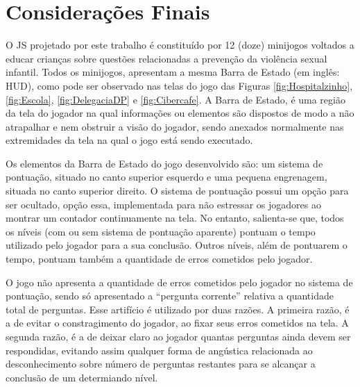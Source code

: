 
\section{Considerações Finais}\label{sec:fim}

O \acf{JS} projetado por este trabalho é constituído por 12 (doze) minijogos voltados a educar crianças sobre questões relacionadas a prevenção da violência sexual infantil. Todos os minijogos, apresentam a mesma Barra de Estado (em inglês: \acl{HUD}), como pode ser observado nas telas do jogo das Figuras \ref{fig:Hospitalzinho}, \ref{fig:Escola}, \ref{fig:DelegaciaDP} e \ref{fig:Cibercafe}. A Barra de Estado, é uma região da tela do jogador na qual informações ou elementos são dispostos de modo a não atrapalhar e nem obstruir a visão do jogador, sendo anexados normalmente nas extremidades da tela na qual o jogo está sendo executado. %

Os elementos da Barra de Estado do jogo desenvolvido são: um sistema de pontuação, situado no canto superior esquerdo e uma pequena engrenagem, situada no canto superior direito. O sistema de pontuação possui um opção para ser ocultado, opção essa, implementada para não estressar os jogadores ao montrar um contador continuamente na tela.
No entanto, salienta-se que, todos os níveis (com ou sem sistema de pontuação aparente) pontuam o tempo utilizado pelo jogador para a sua conclusão. Outros níveis, além de pontuarem o tempo, pontuam também a quantidade de erros cometidos pelo jogador. 

O jogo não apresenta a quantidade de erros cometidos pelo jogador no sistema de pontuação, sendo só apresentado a ``pergunta corrente'' relativa a quantidade total de perguntas. Esse artifício é utilizado por duas razões. A primeira razão, é a de evitar o constragimento do jogador, ao fixar seus erros cometidos na tela. A segunda razão, é a de deixar claro ao jogador quantas perguntas ainda devem ser respondidas, evitando assim qualquer forma de angústica relacionada ao desconhecimento sobre número de perguntas restantes para se alcançar a conclusão de um determiando nível.

